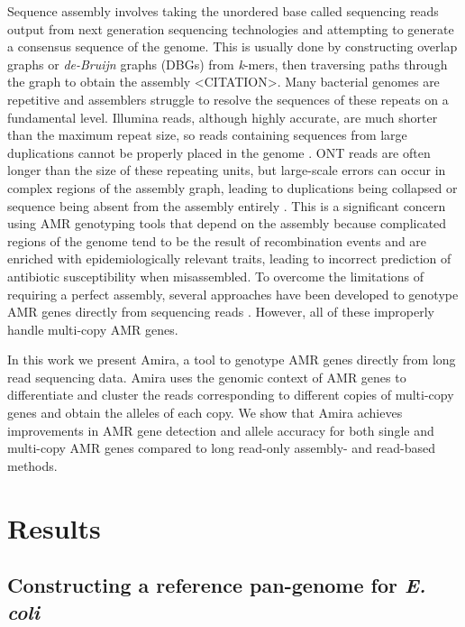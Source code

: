 Sequence assembly involves taking the unordered base called sequencing reads output from next generation sequencing technologies and attempting to generate a consensus sequence of the genome. This is usually done by constructing overlap graphs or \textit{de-Bruijn} graphs (DBGs) from \textit{k}-mers, then traversing paths through the graph to obtain the assembly <CITATION>. Many bacterial genomes are repetitive and assemblers struggle to resolve the sequences of these repeats on a fundamental level. Illumina reads, although highly accurate, are much shorter than the maximum repeat size, so reads containing sequences from large duplications cannot be properly placed in the genome \cite{KOREN2015110}. ONT reads are often longer than the size of these repeating units, but large-scale errors can occur in complex regions of the assembly graph, leading to duplications being collapsed or sequence being absent from the assembly entirely \cite{10.12688/f1000research.21782.1, 10.1186/s13059-021-02483-z, FosterNyarko2023}. This is a significant concern using AMR genotyping tools that depend on the assembly because complicated regions of the genome tend to be the result of recombination events and are enriched with epidemiologically relevant traits, leading to incorrect prediction of antibiotic susceptibility when misassembled. To overcome the limitations of requiring a perfect assembly, several approaches have been developed to genotype AMR genes directly from sequencing reads \cite{Bortolaia2020, Bradley2015, Hunt2017}. However, all of these improperly handle multi-copy AMR genes.

In this work we present Amira, a tool to genotype AMR genes directly from long read sequencing data. Amira uses the genomic context of AMR genes to differentiate and cluster the reads corresponding to different copies of multi-copy genes and obtain the alleles of each copy. We show that Amira achieves improvements in AMR gene detection and allele accuracy for both single and multi-copy AMR genes compared to long read-only assembly- and read-based methods. 

\section*{Results}

\subsection*{Constructing a reference pan-genome for \textit{E. coli}}


